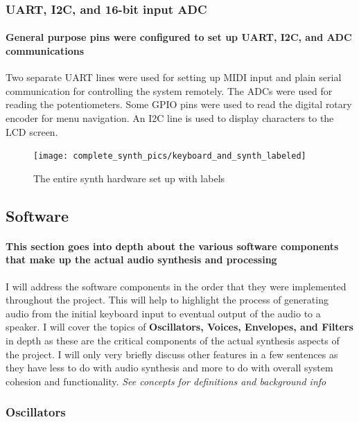 \documentclass[acmlarge,screen]{acmart}
\begin{document}
	\subsubsection{UART, I2C, and 16-bit input ADC}
	\paragraph{General purpose pins were configured to set up UART, I2C, and ADC communications} Two separate UART lines were used for setting up MIDI input and plain serial communication for controlling the system remotely. The ADCs were used for reading the potentiometers. Some GPIO pins were used to read the digital rotary encoder for menu navigation. An I2C line is used to display characters to the LCD screen.

	\begin{figure}[H]
		\texttt{[image: complete\_synth\_pics/keyboard\_and\_synth\_labeled]}
		\caption{The entire synth hardware set up with labels}
		\centering
	\end{figure}

\subsection{Software}
	\paragraph{This section goes into depth about the various software components that make up the actual audio synthesis and processing} I will address the software components in the order that they were implemented throughout the project. This will help to highlight the process of generating audio from the initial keyboard input to eventual output of the audio to a speaker. I will cover the topics of \textbf{Oscillators, Voices, Envelopes, and Filters} in depth as these are the critical components of the actual synthesis aspects of the project. I will only very briefly discuss other features in a few sentences as they have less to do with audio synthesis and more to do with overall system cohesion and functionality. \textit{See concepts for definitions and background info}

	\subsubsection{Oscillators}
\end{document}
